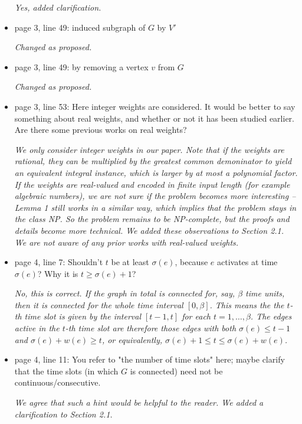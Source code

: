 \documentclass[11pt,a4paper]{article}
\begin{document}
\begin{itemize}
\textit{Yes, added clarification.}

\item page 3, line 49: induced subgraph of $G$ by $V'$

\textit{Changed as proposed.}

\item page 3, line 49: by removing a vertex $v$ from $G$

\textit{Changed as proposed.}

\item page 3, line 53: Here integer weights are considered. It would be better to say something about real weights, and whether or not it has been studied earlier. Are there some previous works on real weights?

\textit{We only consider integer weights in our paper. Note that if the weights are rational, they can be multiplied by the greatest common demoninator to yield an equivalent integral instance, which is larger by at most a polynomial factor. If the weights are real-valued and encoded in finite input length (for example algebraic numbers), we are not sure if the problem becomes more interesting -- Lemma 1 still works in a similar way, which implies that the problem stays in the class NP. So the problem remains to be NP-complete, but the proofs and details become more technical. We added these observations to Section 2.1. We are not aware of any prior works with real-valued weights.}

\item page 4, line 7: Shouldn't $t$ be at least $\sigma(e)$, because $e$ activates at time $\sigma(e)$? Why it is $t \geq \sigma(e)+1$?

\textit{No, this is correct. If the graph in total is connected for, say, $\beta$ time units, then it is connected for the whole time interval $[0, \beta]$. This means the the $t$-th time slot is given by the interval $[t-1,t]$ for each $t=1,\dots,\beta$. The edges active in the $t$-th time slot are therefore those edges with both $\sigma(e) \leq t-1$ and $\sigma(e) + w(e) \geq t$, or equivalently, $\sigma(e) + 1 \leq t \leq \sigma(e) + w(e)$.}

\item page 4, line 11: You refer to "the number of time slots" here; maybe clarify that the time slots (in which $G$ is connected) need not be continuous/consecutive.

\textit{We agree that such a hint would be helpful to the reader. We added a clarification to Section 2.1.}


\end{itemize}
\end{document}
